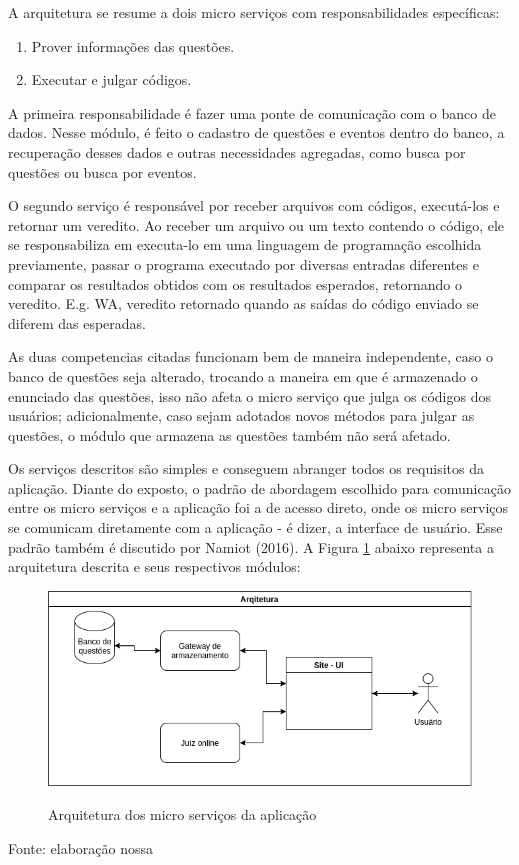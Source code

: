A arquitetura se resume a dois micro serviços com responsabilidades específicas:
\begin{enumerate}
    \item Prover informações das questões.
    \item Executar e julgar códigos.
\end{enumerate}

A primeira responsabilidade é fazer uma ponte de comunicação com o banco de dados. Nesse módulo, é feito o cadastro de questões e eventos dentro do banco, a recuperação desses dados e outras necessidades agregadas, como busca por questões ou busca por eventos.

O segundo serviço é responsável por receber arquivos com códigos, executá-los e retornar um veredito. Ao receber um arquivo ou um texto contendo o código, ele se responsabiliza em executa-lo em uma linguagem de programação escolhida previamente, passar o programa executado por diversas entradas diferentes e comparar os resultados obtidos com os resultados esperados, retornando o veredito. E.g. WA, veredito retornado quando as saídas do código enviado se diferem das esperadas.

As duas competencias citadas funcionam bem de maneira independente, caso o banco de questões seja alterado, trocando a maneira em que é armazenado o enunciado das questões, isso não afeta o micro serviço que julga os códigos dos usuários; adicionalmente, caso sejam adotados novos métodos para julgar as questões, o módulo que armazena as questões também não será afetado.

Os serviços descritos são simples e conseguem abranger todos os requisitos da aplicação. Diante do exposto, o padrão de abordagem escolhido para comunicação entre os micro serviços e a aplicação foi a de acesso direto, onde os micro serviços se comunicam diretamente com a aplicação - é dizer, a interface de usuário. Esse padrão também é discutido por Namiot (2016). A Figura \ref{fig:architecture} abaixo representa a arquitetura descrita e seus respectivos módulos:

\begin{figure}[h]
    \centering
    \caption{Arquitetura dos micro serviços da aplicação}
    \includegraphics[keepaspectratio=true,scale=0.6]{figuras/arquiteture.png}
    \label{fig:architecture}
\end{figure}
\begin{center}
    Fonte: elaboração nossa
\end{center}

